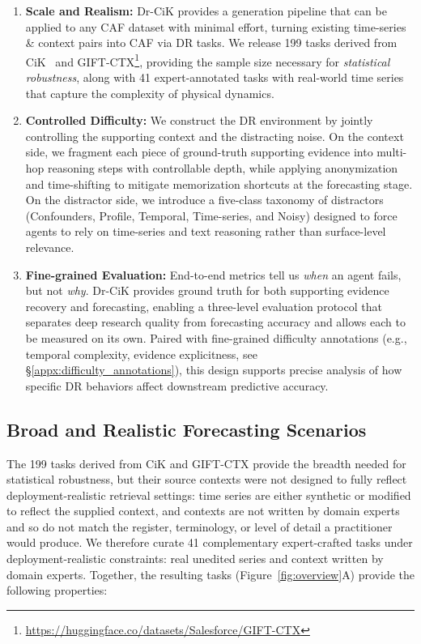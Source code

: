 \documentclass[]{servicenow}
\begin{document}
\begin{enumerate}[leftmargin=*, itemsep=0.2em, topsep=0.2em, parsep=0pt, partopsep=0pt]
    \item \textbf{Scale and Realism:} Dr-CiK provides a generation pipeline that can be applied to any CAF dataset with minimal effort, turning existing time-series \& context pairs into CAF via DR tasks. We release 199 tasks derived from CiK~\citep{williams2024context} and GIFT-CTX\footnote{\url{https://huggingface.co/datasets/Salesforce/GIFT-CTX}}, providing the sample size necessary for \emph{statistical robustness}, along with 41 expert-annotated tasks with real-world time series that capture the complexity of physical dynamics.

    \item \textbf{Controlled Difficulty:} 
    We construct the DR environment by jointly controlling the supporting context and the distracting noise. On the context side, we fragment each piece of ground-truth supporting evidence into multi-hop reasoning steps with controllable depth, while applying anonymization and time-shifting to mitigate memorization shortcuts at the forecasting stage. On the distractor side, we introduce a five-class taxonomy of distractors (Confounders, Profile, Temporal, Time-series, and Noisy) designed to force agents to rely on time-series and text reasoning rather than surface-level relevance.

    \item \textbf{Fine-grained Evaluation:} End-to-end metrics tell us \emph{when} an agent fails, but not \emph{why}. Dr-CiK provides ground truth for both supporting evidence recovery and forecasting, enabling a three-level evaluation protocol that separates deep research quality from forecasting accuracy and allows each to be measured on its own. Paired with fine-grained difficulty annotations (e.g., temporal complexity, evidence explicitness, see \S\ref{appx:difficulty_annotations}), this design supports precise analysis of how specific DR behaviors affect downstream predictive accuracy.

\end{enumerate}


\subsection{Broad and Realistic Forecasting Scenarios}
The 199 tasks derived from CiK and GIFT-CTX provide the breadth needed for statistical robustness, but their source contexts were not designed to fully reflect deployment-realistic retrieval settings: time series are either synthetic or modified to reflect the supplied context, and contexts are not written by domain experts and so do not match the register, terminology, or level of detail a practitioner would produce. 
We therefore curate 41 complementary expert-crafted tasks under deployment-realistic constraints: real unedited series and context written by domain experts.  
Together, the resulting tasks (Figure~\ref{fig:overview}A) provide the following properties:
\end{document}
